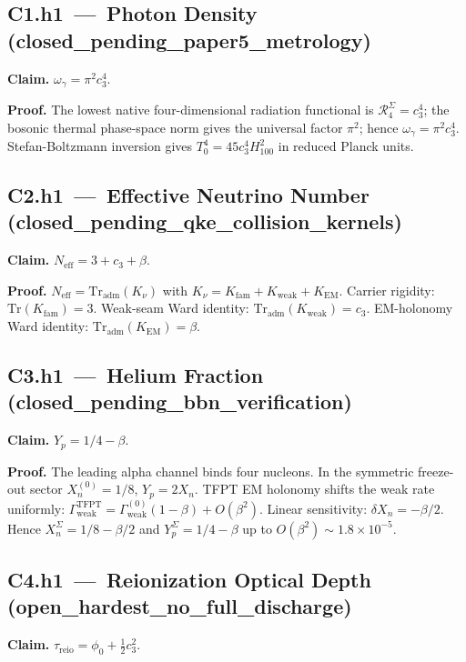 \documentclass[11pt,a4paper]{article}
\begin{document}
\subsection*{C1.h1 \,---\, Photon Density
\,(\textsf{closed\_pending\_paper5\_metrology})}
\textbf{Claim.}
\(\omega_\gamma=\pi^2 c_3^4\).

\textbf{Proof.}
The lowest native four-dimensional radiation functional is
\(\mathcal R_4^\Sigma=c_3^4\); the bosonic thermal phase-space norm
gives the universal factor \(\pi^2\); hence
\(\omega_\gamma=\pi^2 c_3^4\).  Stefan-Boltzmann inversion gives
\(T_0^4=45 c_3^4 H_{100}^2\) in reduced Planck units.

\subsection*{C2.h1 \,---\, Effective Neutrino Number
\,(\textsf{closed\_pending\_qke\_collision\_kernels})}
\textbf{Claim.} \(N_{\mathrm{eff}}=3+c_3+\beta\).

\textbf{Proof.}
\(N_{\mathrm{eff}}=\mathrm{Tr}_{\mathrm{adm}}(K_\nu)\) with
\(K_\nu=K_{\mathrm{fam}}+K_{\mathrm{weak}}+K_{\mathrm{EM}}\).
Carrier rigidity: \(\mathrm{Tr}(K_{\mathrm{fam}})=3\).
Weak-seam Ward identity: \(\mathrm{Tr}_{\mathrm{adm}}(K_{\mathrm{weak}})=c_3\).
EM-holonomy Ward identity: \(\mathrm{Tr}_{\mathrm{adm}}(K_{\mathrm{EM}})=\beta\).

\subsection*{C3.h1 \,---\, Helium Fraction
\,(\textsf{closed\_pending\_bbn\_verification})}
\textbf{Claim.} \(Y_p=1/4-\beta\).

\textbf{Proof.}
The leading alpha channel binds four nucleons.  In the symmetric
freeze-out sector \(X_n^{(0)}=1/8\), \(Y_p=2X_n\).  TFPT EM holonomy
shifts the weak rate uniformly:
\(\Gamma_{\mathrm{weak}}^{\mathrm{TFPT}}=
\Gamma_{\mathrm{weak}}^{(0)}(1-\beta)+O(\beta^2)\).  Linear
sensitivity: \(\delta X_n=-\beta/2\).  Hence
\(X_n^\Sigma=1/8-\beta/2\) and \(Y_p^\Sigma=1/4-\beta\) up to
\(O(\beta^2)\sim 1.8\times 10^{-5}\).

\subsection*{C4.h1 \,---\, Reionization Optical Depth
\,(\textsf{open\_hardest\_no\_full\_discharge})}
\textbf{Claim.} \(\tau_{\mathrm{reio}}=\phi_0+\tfrac12 c_3^2\).
\end{document}
